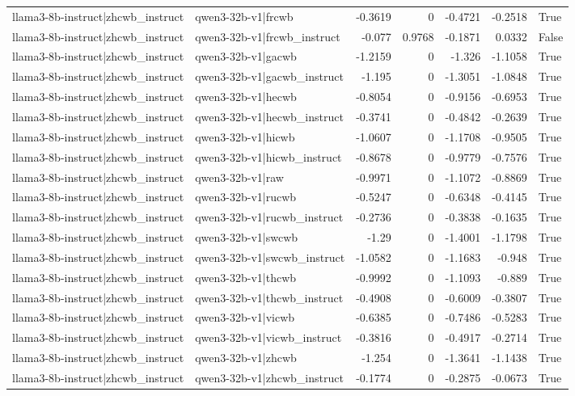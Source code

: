 \begin{table}
\begin{tabular}{l l r r r r l}
llama3-8b-instruct|zhcwb_instruct & qwen3-32b-v1|frcwb & -0.3619 & 0 & -0.4721 & -0.2518 & True \\
llama3-8b-instruct|zhcwb_instruct & qwen3-32b-v1|frcwb_instruct & -0.077 & 0.9768 & -0.1871 & 0.0332 & False \\
llama3-8b-instruct|zhcwb_instruct & qwen3-32b-v1|gacwb & -1.2159 & 0 & -1.326 & -1.1058 & True \\
llama3-8b-instruct|zhcwb_instruct & qwen3-32b-v1|gacwb_instruct & -1.195 & 0 & -1.3051 & -1.0848 & True \\
llama3-8b-instruct|zhcwb_instruct & qwen3-32b-v1|hecwb & -0.8054 & 0 & -0.9156 & -0.6953 & True \\
llama3-8b-instruct|zhcwb_instruct & qwen3-32b-v1|hecwb_instruct & -0.3741 & 0 & -0.4842 & -0.2639 & True \\
llama3-8b-instruct|zhcwb_instruct & qwen3-32b-v1|hicwb & -1.0607 & 0 & -1.1708 & -0.9505 & True \\
llama3-8b-instruct|zhcwb_instruct & qwen3-32b-v1|hicwb_instruct & -0.8678 & 0 & -0.9779 & -0.7576 & True \\
llama3-8b-instruct|zhcwb_instruct & qwen3-32b-v1|raw & -0.9971 & 0 & -1.1072 & -0.8869 & True \\
llama3-8b-instruct|zhcwb_instruct & qwen3-32b-v1|rucwb & -0.5247 & 0 & -0.6348 & -0.4145 & True \\
llama3-8b-instruct|zhcwb_instruct & qwen3-32b-v1|rucwb_instruct & -0.2736 & 0 & -0.3838 & -0.1635 & True \\
llama3-8b-instruct|zhcwb_instruct & qwen3-32b-v1|swcwb & -1.29 & 0 & -1.4001 & -1.1798 & True \\
llama3-8b-instruct|zhcwb_instruct & qwen3-32b-v1|swcwb_instruct & -1.0582 & 0 & -1.1683 & -0.948 & True \\
llama3-8b-instruct|zhcwb_instruct & qwen3-32b-v1|thcwb & -0.9992 & 0 & -1.1093 & -0.889 & True \\
llama3-8b-instruct|zhcwb_instruct & qwen3-32b-v1|thcwb_instruct & -0.4908 & 0 & -0.6009 & -0.3807 & True \\
llama3-8b-instruct|zhcwb_instruct & qwen3-32b-v1|vicwb & -0.6385 & 0 & -0.7486 & -0.5283 & True \\
llama3-8b-instruct|zhcwb_instruct & qwen3-32b-v1|vicwb_instruct & -0.3816 & 0 & -0.4917 & -0.2714 & True \\
llama3-8b-instruct|zhcwb_instruct & qwen3-32b-v1|zhcwb & -1.254 & 0 & -1.3641 & -1.1438 & True \\
llama3-8b-instruct|zhcwb_instruct & qwen3-32b-v1|zhcwb_instruct & -0.1774 & 0 & -0.2875 & -0.0673 & True \\

\end{tabular}
\end{table}
